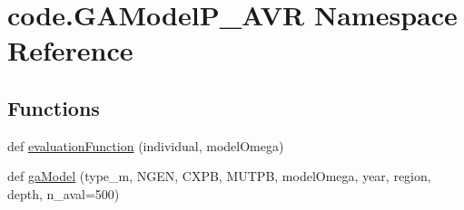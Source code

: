 \hypertarget{namespacecode_1_1_g_a_model_p___a_v_r}{}\section{code.\+G\+A\+Model\+P\+\_\+\+A\+VR Namespace Reference}
\label{namespacecode_1_1_g_a_model_p___a_v_r}
\subsection*{Functions}
\begin{DoxyCompactItemize}
\item 
def \hyperlink{namespacecode_1_1_g_a_model_p___a_v_r_ae008eef98ea5f21ea46b555bff16501b}{evaluation\+Function} (individual, model\+Omega)
\item 
def \hyperlink{namespacecode_1_1_g_a_model_p___a_v_r_a922bf40c33ff02ee40ad28ccb7122b83}{ga\+Model} (type\+\_\+m, N\+G\+EN, C\+X\+PB, M\+U\+T\+PB, model\+Omega, year, region, depth, n\+\_\+aval=500)
\end{DoxyCompactItemize}
